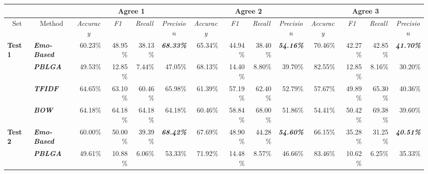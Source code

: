 \documentclass[12pt,a4paper]{report}
\theoremstyle{definition}
\begin{document}
\begin{CJK}{UTF8}{bsmi}
\begin{table}[H]
\scriptsize
\begin{tabular}{ll|rrrr|rrrr|rrrr}
\hline
                                                      &                             & \multicolumn{4}{c|}{\textbf{Agree 1}}                                                                                                                   & \multicolumn{4}{c|}{\textbf{Agree 2}}                                                                                                                   & \multicolumn{4}{c}{\textbf{Agree 3}}                                                                                                                   \\ \hline
\multicolumn{1}{c|}{Set}                              & \multicolumn{1}{c|}{Method} & \multicolumn{1}{c}{\textit{Accuracy}} & \multicolumn{1}{c}{\textit{F1}} & \multicolumn{1}{c}{\textit{Recall}} & \multicolumn{1}{c|}{\textit{Precision}} & \multicolumn{1}{c}{\textit{Accuracy}} & \multicolumn{1}{c}{\textit{F1}} & \multicolumn{1}{c}{\textit{Recall}} & \multicolumn{1}{c|}{\textit{Precision}} & \multicolumn{1}{c}{\textit{Accuracy}} & \multicolumn{1}{c}{\textit{F1}} & \multicolumn{1}{c}{\textit{Recall}} & \multicolumn{1}{c}{\textit{Precision}} \\ \hline
\multicolumn{1}{l|}{\textbf{Test 1}} & \textit{\textbf{Emo-Based}} & 60.23\% & 48.95\% & 38.13\% & \textit{\textbf{68.33\%}} & 65.34\% & 44.94\% & 38.40\% & \textit{\textbf{54.16\%}} & 70.46\% & 42.27\% & 42.85\% & \textit{\textbf{41.70\%}}\\
\multicolumn{1}{l|}{}                                 & \textit{\textbf{PBLGA}}     & 49.53\% & 12.85\% & 7.44\% & 47.05\% & 68.13\% & 14.40\% & 8.80\% & 39.70\% & 82.55\% & 12.85\% & 8.16\% & 30.20\%\\
\multicolumn{1}{l|}{}                                 & \textit{\textbf{TFIDF}}     & 64.65\% & 63.10\% & 60.46\% & 65.98\% & 61.39\% & 57.19\% & 62.40\% & 52.79\% & 57.67\% & 49.89\% & 65.30\% & 40.36\%\\
\multicolumn{1}{l|}{}                                 & \textit{\textbf{BOW}}       & 64.18\% & 64.18\% & 64.18\% & 64.18\% & 60.46\% & 58.84\% & 68.00\% & 51.86\% & 54.41\% & 50.42\% & 69.38\% & 39.60\%\\ \hline
\multicolumn{1}{l|}{\textbf{Test 2}} & \textit{\textbf{Emo-Based}} & 60.00\% & 50.00\% & 39.39\% & \textit{\textbf{68.42\%}} & 67.69\% & 48.90\% & 44.28\% & \textit{\textbf{54.60\%}} & 66.15\% & 35.28\% & 31.25\% & \textit{\textbf{40.51\%}}\\
\multicolumn{1}{l|}{}                                 & \textit{\textbf{PBLGA}}     & 49.61\% & 10.88\% & 6.06\% & 53.33\% & 71.92\% & 14.48\% & 8.57\% & 46.66\% & 83.46\% & 10.62\% & 6.25\% & 35.33\%\\

\end{tabular}
\end{table}
\end{CJK}
\end{document}
